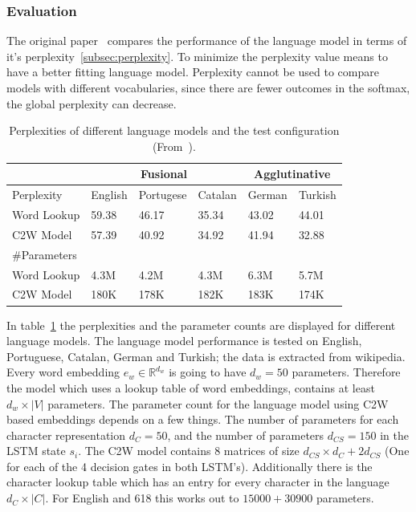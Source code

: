 \subsubsection{Evaluation}

The original paper~\cite{DBLP:journals/corr/LingLMAADBT15} compares the performance of the language model 
in terms of it's perplexity~\ref{subsec:perplexity}. To minimize the perplexity value means to have a better fitting language model.
Perplexity cannot be used to compare models with different vocabularies,
since there are fewer outcomes in the softmax, the global perplexity can decrease.

\begin{table}
\begin{center}
\begin{tabular}{ l l l l l l }
  \hline
             & \multicolumn{3}{|c|}{Fusional} &   \multicolumn{2}{|c|}{Agglutinative} \\ \hline
  Perplexity   & English & Portugese & Catalan & German & Turkish \\
  Word Lookup  & 59.38   & 46.17     &   35.34 & 43.02  & 44.01   \\
  C2W Model    & 57.39   & 40.92     &   34.92 & 41.94  & 32.88   \\
  \#Parameters  &         &           &         &        &         \\
  Word Lookup  & 4.3M    & 4.2M      &  4.3M   & 6.3M   & 5.7M   \\
  C2W Model    & 180K    & 178K      &  182K   & 183K   & 174K   \\

\end{tabular}
\end{center}
\caption{Perplexities of different language models and the test configuration (From~\cite{DBLP:journals/corr/LingLMAADBT15}).}
\label{tab:perplexity}
\end{table}

In table~\ref{tab:perplexity} the perplexities and the parameter counts are displayed for different language models.
The language model performance is tested on English, Portuguese, Catalan, German and Turkish; the data is extracted from wikipedia.
Every word embedding $e_{w} \in \mathbb{R}^{d_w}$ is going to have $d_w = 50$ parameters.
Therefore the model which uses a lookup table of word embeddings, contains at least $d_w \times |V|$ parameters.
The parameter count for the language model using C2W based embeddings depends on a few things. The number of parameters for each character
representation $d_C = 50$, and the number of parameters $d_{CS} = 150$ in the LSTM state $s_i$. The C2W model contains 8 matrices of 
size $d_{CS} \times d_C + 2d_{CS}$ (One for each of the 4 decision gates in both LSTM's). Additionally there is the character lookup table 
which has an entry for every character in the language $d_C \times |C|$. For English and 618 this works out to $15000 + 30900$ parameters.

